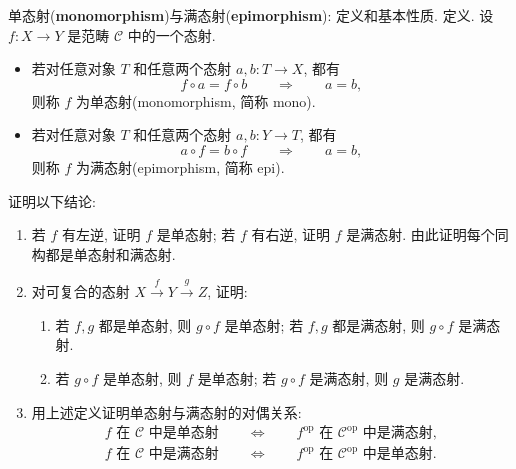 \documentclass{article}
\newcommand{\op}{^{\mathrm{op}}}
\begin{document}
\begin{problem}
  {\heiti 单态射}(\textbf{monomorphism}){\heiti 与满态射}(\textbf{epimorphism}){\heiti : 定义和基本性质}. 定义. 设 $f:X\to Y$ 是范畴 $\mathcal C$ 中的一个态射.

  \begin{itemize}
    \item 若对任意对象 $T$ 和任意两个态射 $a,b:T\to X$, 都有
      \[
        f\circ a=f\circ b\qquad\Longrightarrow\qquad a=b,
      \]
      则称 $f$ 为单态射(monomorphism, 简称 mono).

    \item 若对任意对象 $T$ 和任意两个态射 $a,b:Y\to T$, 都有
      \[
        a\circ f=b\circ f\qquad\Longrightarrow\qquad a=b,
      \]
      则称 $f$ 为满态射(epimorphism, 简称 epi).
  \end{itemize}

  证明以下结论:
  \begin{enumerate}
    \item[(a)] 若 $f$ 有左逆, 证明 $f$ 是单态射; 若 $f$ 有右逆, 证明 $f$ 是满态射. 由此证明每个同构都是单态射和满态射.

    \item[(b)] 对可复合的态射 $X\xrightarrow{f}Y\xrightarrow{g}Z$, 证明:
      \begin{enumerate}
        \item[(i)] 若 $f,g$ 都是单态射, 则 $g\circ f$ 是单态射; 若 $f,g$ 都是满态射, 则 $g\circ f$ 是满态射.
        \item[(ii)] 若 $g\circ f$ 是单态射, 则 $f$ 是单态射; 若 $g\circ f$ 是满态射, 则 $g$ 是满态射.
      \end{enumerate}

    \item[(c)] 用上述定义证明单态射与满态射的对偶关系:
			\begin{gather*}
        f\text{ 在 }\mathcal C\text{ 中是单态射}\qquad\Longleftrightarrow\qquad
        f\op\text{ 在 }\mathcal C\op\text{ 中是满态射},\\
        f\text{ 在 }\mathcal C\text{ 中是满态射}\qquad\Longleftrightarrow\qquad
        f\op\text{ 在 }\mathcal C\op\text{ 中是单态射}.
			\end{gather*}
  \end{enumerate}
\end{problem}
\end{document}
